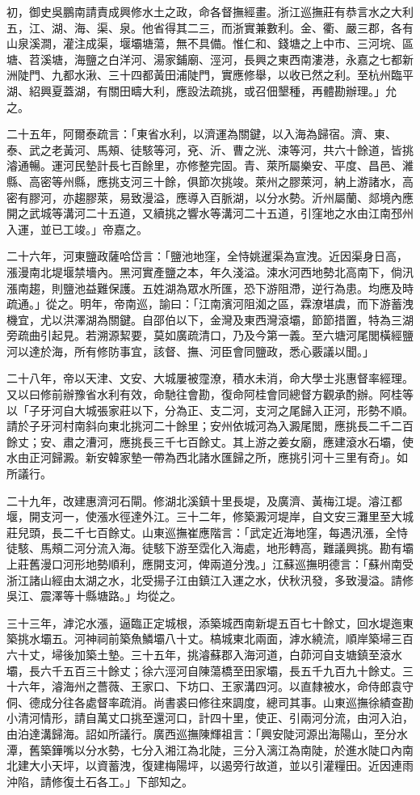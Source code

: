 \begin{pinyinscope}
初，御史吳鵬南請責成興修水土之政，命各督撫經畫。浙江巡撫莊有恭言水之大利五，江、湖、海、渠、泉。他省得其二三，而浙實兼數利。金、衢、嚴三郡，各有山泉溪澗，灌注成渠，堰壩塘蕩，無不具備。惟仁和、錢塘之上中市、三河垸、區塘、苕溪塘，海鹽之白洋河、湯家鋪廟、涇河，長興之東西南漊港，永嘉之七都新洲陡門、九都水湫、三十四都黃田浦陡門，實應修舉，以收已然之利。至杭州臨平湖、紹興夏蓋湖，有關田疇大利，應設法疏挑，或召佃墾種，再體勘辦理。」允之。

二十五年，阿爾泰疏言：「東省水利，以濟運為關鍵，以入海為歸宿。濟、東、泰、武之老黃河、馬頰、徒駭等河，兗、沂、曹之洸、涑等河，共六十餘道，皆挑濬通暢。運河民墊計長七百餘里，亦修整完固。青、萊所屬樂安、平度、昌邑、濰縣、高密等州縣，應挑支河三十餘，俱節次挑竣。萊州之膠萊河，納上游諸水，高密有膠河，亦趨膠萊，易致漫溢，應導入百脈湖，以分水勢。沂州屬蘭、郯境內應開之武城等溝河二十五道，又續挑之響水等溝河二十五道，引窪地之水由江南邳州入運，並已工竣。」帝嘉之。

二十六年，河東鹽政薩哈岱言：「鹽池地窪，全恃姚暹渠為宣洩。近因渠身日高，漲漫南北堤堰禁墻內。黑河實產鹽之本，年久淺溢。涑水河西地勢北高南下，倘汛漲南趨，則鹽池益難保護。五姓湖為眾水所匯，恐下游阻滯，逆行為患。均應及時疏通。」從之。明年，帝南巡，諭曰：「江南濱河阻洳之區，霖潦堪虞，而下游蓄洩機宜，尤以洪澤湖為關鍵。自邵伯以下，金灣及東西灣滾壩，節節措置，特為三湖旁疏曲引起見。若溯源絜要，莫如廣疏清口，乃及今第一義。至六塘河尾閭橫經鹽河以達於海，所有修防事宜，該督、撫、河臣會同鹽政，悉心覈議以聞。」

二十八年，帝以天津、文安、大城屢被霪潦，積水未消，命大學士兆惠督率經理。又以曰修前辦豫省水利有效，命馳往會勘，復命阿桂會同總督方觀承酌辦。阿桂等以「子牙河自大城張家莊以下，分為正、支二河，支河之尾歸入正河，形勢不順。請於子牙河村南斜向東北挑河二十餘里；安州依城河為入澱尾閭，應挑長二千二百餘丈；安、肅之漕河，應挑長三千七百餘丈。其上游之姜女廟，應建滾水石壩，使水由正河歸澱。新安韓家墊一帶為西北諸水匯歸之所，應挑引河十三里有奇」。如所議行。

二十九年，改建惠濟河石閘。修湖北溪鎮十里長堤，及廣濟、黃梅江堤。濬江都堰，開支河一，使漲水徑達外江。三十二年，修築澱河堤岸，自文安三灘里至大城莊兒頭，長二千七百餘丈。山東巡撫崔應階言：「武定近海地窪，每遇汛漲，全恃徒駭、馬頰二河分流入海。徒駭下游至霑化入海處，地形轉高，難議興挑。勘有壩上莊舊漫口河形地勢順利，應開支河，俾兩道分洩。」江蘇巡撫明德言：「蘇州南受浙江諸山經由太湖之水，北受揚子江由鎮江入運之水，伏秋汛發，多致漫溢。請修吳江、震澤等十縣塘路。」均從之。

三十三年，滹沱水漲，逼臨正定城根，添築城西南新堤五百七十餘丈，回水堤迤東築挑水壩五。河神祠前築魚鱗壩八十丈。槁城東北兩面，滹水繞流，順岸築埽三百六十丈，埽後加築土墊。三十五年，挑濬蘇郡入海河道，白茆河自支塘鎮至滾水壩，長六千五百三十餘丈；徐六涇河自陳蕩橋至田家壩，長五千九百九十餘丈。三十六年，濬海州之薔薇、王家口、下坊口、王家溝四河。以直隸被水，命侍郎袁守侗、德成分往各處督率疏消。尚書裘曰修往來調度，總司其事。山東巡撫徐績查勘小清河情形，請自萬丈口挑至還河口，計四十里，使正、引兩河分流，由河入泊，由泊達溝歸海。詔如所議行。廣西巡撫陳輝祖言：「興安陡河源出海陽山，至分水潭，舊築鏵嘴以分水勢，七分入湘江為北陡，三分入漓江為南陡，於進水陡口內南北建大小天坪，以資蓄洩，復建梅陽坪，以遏旁行故道，並以引灌糧田。近因連雨沖陷，請修復土石各工。」下部知之。


\end{pinyinscope}
